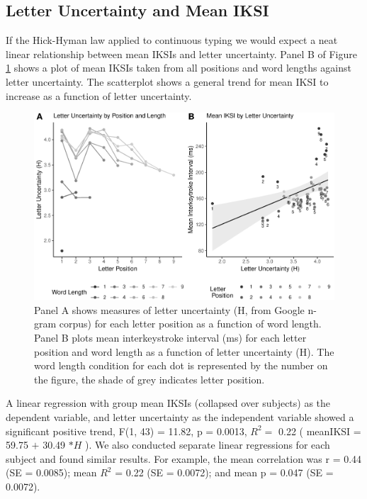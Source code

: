 \documentclass[,man,donotrepeattitle,floatsintext]{apa6}
\begin{document}
\hypertarget{letter-uncertainty-and-mean-iksi}{%
\subsection{Letter Uncertainty and Mean IKSI}\label{letter-uncertainty-and-mean-iksi}}

If the Hick-Hyman law applied to continuous typing we would expect a neat linear relationship between mean IKSIs and letter uncertainty. Panel B of Figure \ref{fig:letter-uncertainty-by-IKSI} shows a plot of mean IKSIs taken from all positions and word lengths against letter uncertainty. The scatterplot shows a general trend for mean IKSI to increase as a function of letter uncertainty.



\begin{figure}
\centering
\includegraphics{Entropy_typing_draft_files/figure-latex/letter-uncertainty-by-IKSI-1.pdf}
\caption{\label{fig:letter-uncertainty-by-IKSI}Panel A shows measures of letter uncertainty (H, from Google n-gram corpus) for each letter position as a function of word length. Panel B plots mean interkeystroke interval (ms) for each letter position and word length as a function of letter uncertainty (H). The word length condition for each dot is represented by the number on the figure, the shade of grey indicates letter position.}
\end{figure}

A linear regression with group mean IKSIs (collapsed over subjects) as the dependent variable, and letter uncertainty as the independent variable showed a significant positive trend, F(1, 43) = 11.82, p = 0.0013, \(R^2 =\) 0.22 ( meanIKSI = 59.75 \(+\) 30.49 \(* H\) ). We also conducted separate linear regressions for each subject and found similar results. For example, the mean correlation was r = 0.44 (SE = 0.0085); mean \(R^2\) = 0.22 (SE = 0.0072); and mean p = 0.047 (SE = 0.0072).
\end{document}
